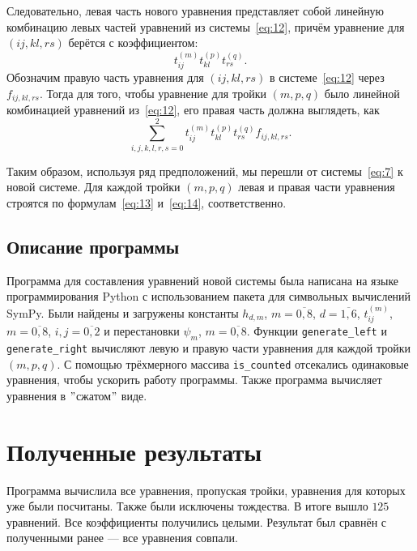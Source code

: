 \documentclass[12pt]{article}
\begin{document}
    Следовательно, левая часть нового уравнения представляет собой линейную комбинацию левых частей уравнений из системы~\eqref{eq:12},
    причём уравнение для $(ij,kl,rs)$ берётся с коэффициентом:
    \[
        t_{ij}^{(m)} t_{kl}^{(p)} t_{rs}^{(q)}.
    \]
    Обозначим правую часть уравнения для $(ij,kl,rs)$ в системе~\eqref{eq:12} через $f_{ij,kl,rs}$.
    Тогда для того, чтобы уравнение для тройки $(m, p, q)$ было линейной комбинацией уравнений из~\eqref{eq:12}, его правая часть должна выглядеть, как
    \begin{equation}
        \sum_{i,j,k,l,r,s=0}^2 t_{ij}^{(m)} t_{kl}^{(p)} t_{rs}^{(q)} f_{ij,kl,rs}.\label{eq:14}
    \end{equation}

    Таким образом, используя ряд предположений, мы перешли от системы~\eqref{eq:7} к новой системе.
    Для каждой тройки $ (m, p, q) $ левая и правая части уравнения строятся по формулам~\eqref{eq:13} и~\eqref{eq:14}, соответственно.

    \subsection{Описание программы}\label{subsec:-2}

    Программа для составления уравнений новой системы была написана на языке программирования Python с использованием пакета для символьных вычислений SymPy.
    Были найдены и загружены константы $ h_{d,m} $, $ m=\overline{0,8} $, $ d=\overline{1,6} $, $ t_{ij}^{(m)} $, $ m=\overline{0,8} $, $ i,j=\overline{0,2} $ и перестановки
    $ \psi_m $, $ m=\overline{0,8} $.
    Функции \texttt{generate\_left} и \texttt{generate\_right} вычисляют левую и правую части уравнения для каждой тройки $ (m, p, q) $.
    С помощью трёхмерного массива \texttt{is\_counted} отсекались одинаковые уравнения, чтобы ускорить работу программы.
    Также программа вычисляет уравнения в \("\)сжатом\("\) виде.


    \section{Полученные результаты}\label{sec:results}

    Программа вычислила все уравнения, пропуская тройки, уравнения для которых уже были посчитаны.
    Также были исключены тождества.
    В итоге вышло $ 125 $ уравнений.
    Все коэффициенты получились целыми.
    Результат был сравнён с полученными ранее --- все уравнения совпали.
\end{document}
